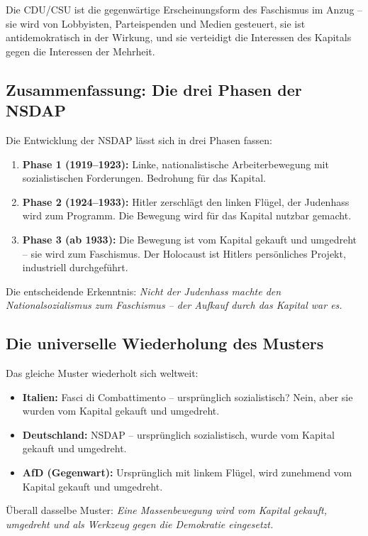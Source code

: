 Die CDU/CSU ist die gegenwärtige Erscheinungsform des Faschismus im Anzug – sie wird von Lobbyisten, Parteispenden und Medien gesteuert, sie ist antidemokratisch in der Wirkung, und sie verteidigt die Interessen des Kapitals gegen die Interessen der Mehrheit.

\subsection{Zusammenfassung: Die drei Phasen der NSDAP}

Die Entwicklung der NSDAP lässt sich in drei Phasen fassen:

\begin{enumerate}
    \item \textbf{Phase 1 (1919--1923):} Linke, nationalistische Arbeiterbewegung mit sozialistischen Forderungen. Bedrohung für das Kapital.
    \item \textbf{Phase 2 (1924--1933):} Hitler zerschlägt den linken Flügel, der Judenhass wird zum Programm. Die Bewegung wird für das Kapital nutzbar gemacht.
    \item \textbf{Phase 3 (ab 1933):} Die Bewegung ist vom Kapital gekauft und umgedreht – sie wird zum Faschismus. Der Holocaust ist Hitlers persönliches Projekt, industriell durchgeführt.
\end{enumerate}

Die entscheidende Erkenntnis: \emph{Nicht der Judenhass machte den Nationalsozialismus zum Faschismus – der Aufkauf durch das Kapital war es.}

\subsection{Die universelle Wiederholung des Musters}

Das gleiche Muster wiederholt sich weltweit:

\begin{itemize}
    \item \textbf{Italien:} Fasci di Combattimento – ursprünglich sozialistisch? Nein, aber sie wurden vom Kapital gekauft und umgedreht.
    \item \textbf{Deutschland:} NSDAP – ursprünglich sozialistisch, wurde vom Kapital gekauft und umgedreht.
    \item \textbf{AfD (Gegenwart):} Ursprünglich mit linkem Flügel, wird zunehmend vom Kapital gekauft und umgedreht.
\end{itemize}

Überall dasselbe Muster: \emph{Eine Massenbewegung wird vom Kapital gekauft, umgedreht und als Werkzeug gegen die Demokratie eingesetzt.}
